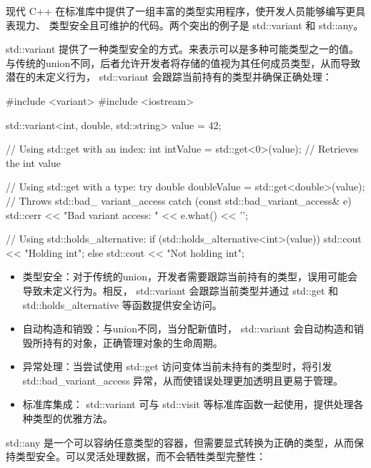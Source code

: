 
现代 C++ 在标准库中提供了一组丰富的类型实用程序，使开发人员能够编写更具表现力、 类型安全且可维护的代码。两个突出的例子是 std::variant 和 std::any。


std::variant 提供了一种类型安全的方式。来表示可以是多种可能类型之一的值。与传统的union不同，后者允许开发者将存储的值视为其任何成员类型，从而导致潜在的未定义行为， std::variant 会跟踪当前持有的类型并确保正确处理：

\begin{cpp}
#include <variant>
#include <iostream>

std::variant<int, double, std::string> value = 42;

// Using std::get with an index:
int intValue = std::get<0>(value); // Retrieves the int value

// Using std::get with a type:
try {
    double doubleValue = std::get<double>(value); // Throws std::bad_
    variant_access
} catch (const std::bad_variant_access& e) {
    std::cerr << "Bad variant access: " << e.what() << '\n';
}

// Using std::holds_alternative:
if (std::holds_alternative<int>(value)) {
    std::cout << "Holding int\n";
} else {
    std::cout << "Not holding int\n";
}
\end{cpp}


\begin{itemize}
\item
类型安全：对于传统的union，开发者需要跟踪当前持有的类型，误用可能会导致未定义行为。相反， std::variant 会跟踪当前类型并通过 std::get 和 std::holds\_alternative 等函数提供安全访问。

\item
自动构造和销毁：与union不同，当分配新值时， std::variant 会自动构造和销毁所持有的对象，正确管理对象的生命周期。

\item
异常处理：当尝试使用 std::get 访问变体当前未持有的类型时，将引发std::bad\_variant\_access 异常，从而使错误处理更加透明且更易于管理。

\item
标准库集成： std::variant 可与 std::visit 等标准库函数一起使用，提供处理各种类型的优雅方法。
\end{itemize}


std::any 是一个可以容纳任意类型的容器，但需要显式转换为正确的类型，从而保持类型安全。可以灵活处理数据，而不会牺牲类型完整性：

